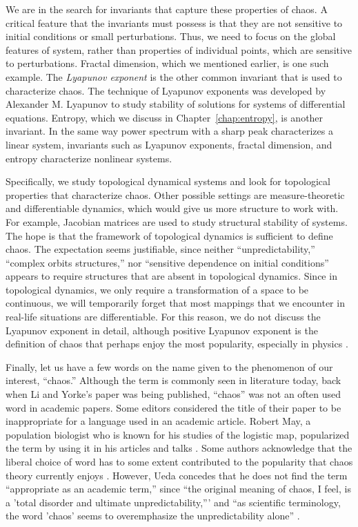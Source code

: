 \documentclass[10pt,twoside,draft]{book}
\begin{document}
We are in the search for invariants that capture these properties of chaos.
A critical feature that the invariants must possess is that they are not sensitive to initial conditions or small perturbations.
Thus, we need to focus on the global features of system, rather than properties of individual points, which are sensitive to perturbations.
Fractal dimension, which we mentioned earlier, is one such example.
The \textit{Lyapunov exponent} is the other common invariant that is used to characterize chaos.
The technique of Lyapunov exponents was developed by Alexander M. Lyapunov to study stability of solutions for systems of differential equations.
Entropy, which we discuss in Chapter~\ref{chap:entropy}, is another invariant.
In the same way power spectrum with a sharp peak characterizes a linear system, invariants such as Lyapunov exponents, fractal dimension, and entropy characterize nonlinear systems.


Specifically, we study topological dynamical systems and look for topological properties that characterize chaos.
Other possible settings are measure-theoretic and differentiable dynamics, which would give us more structure to work with.
For example, Jacobian matrices are used to study structural stability of systems.
The hope is that the framework of topological dynamics is sufficient to define chaos.
The expectation seems justifiable, since neither ``unpredictability,'' ``complex orbits structures,'' nor ``sensitive dependence on initial conditions'' appears to require structures that are absent in topological dynamics.
Since in topological dynamics, we only require a transformation of a space to be continuous, we will temporarily forget that most mappings that we encounter in real-life situations are differentiable.
For this reason, we do not discuss the Lyapunov exponent in detail, although positive Lyapunov exponent is the definition of chaos that perhaps enjoy the most popularity, especially in physics \citep{kantz-schreiber}.


Finally, let us have a few words on the name given to the phenomenon of our interest, ``chaos.''
Although the term is commonly seen in literature today, back when Li and Yorke's paper was being published, ``chaos'' was not an often used word in academic papers.
Some editors considered the title of their paper to be inappropriate for a language used in an academic article.
Robert May, a population biologist who is known for his studies of the logistic map, popularized the term by using it in his articles \citeyearpar{may1,may2} and talks \citep[p.205]{ueda-abraham}.
Some authors acknowledge that the liberal choice of word has to some extent contributed to the popularity that chaos theory currently enjoys \citep[``Exploring Chaos on an Interval'']{ueda-abraham}.
However, Ueda concedes that he does not find the term ``appropriate as an academic term,'' since ``the original meaning of chaos, I feel, is a 'total disorder and ultimate unpredictability,''' and ``as scientific terminology, the word 'chaos' seems to overemphasize the unpredictability alone'' \citep[p.24]{ueda-abraham}.
\end{document}
